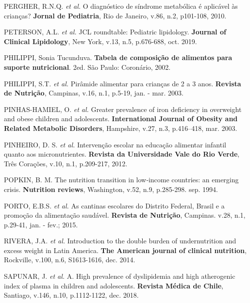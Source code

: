 \bigbreak

\noindent PERGHER, R.N.Q. \textit{et al.} O diagnóstico de síndrome metabólica é aplicável às crianças? \textbf{Jornal de Pediatria}, Rio de Janeiro, v.86, n.2, p101-108, 2010.

\bigbreak

\noindent PETERSON, A.L. \textit{et al.} JCL roundtable: Pediatric lipidology. \textbf{Journal of Clinical Lipidology}, New York, v.13, n.5, p.676-688, oct. 2019.
 
\bigbreak

\noindent PHILIPPI, Sonia Tucunduva. \textbf{Tabela de composição de alimentos para suporte nutricional}. 2ed. São Paulo: Coronário, 2002.

\bigbreak

\noindent PHILIPPI, S.T. \textit{et al.} Pirâmide alimentar para crianças de 2 a 3 anos. \textbf{Revista de Nutrição}, Campinas, v.16, n.1, p.5-19, jan. - mar. 2003.

\bigbreak

\noindent PINHAS-HAMIEL, O. \textit{et al.} Greater prevalence of iron deficiency in overweight and obese children and adolescents. \textbf{International Journal of Obesity and Related Metabolic Disorders}, Hampshire, v.27, n.3, p.416–418, mar. 2003.

\bigbreak

\noindent PINHEIRO, D. S. \textit{et al.} Intervenção escolar na educação alimentar infantil quanto aos micronutrientes. \textbf{Revista da Universidade Vale do Rio Verde}, Três Corações, v.10, n.1, p.209-217, 2012.

\bigbreak

\noindent POPKIN, B. M. The nutrition transition in low‐income countries: an emerging crisis. \textbf{Nutrition reviews}, Washington, v.52, n.9, p.285-298. sep. 1994. 

\bigbreak

\noindent PORTO, E.B.S. \textit{et al.} As cantinas escolares do Distrito Federal, Brasil e a promoção da alimentação saudável. \textbf{Revista de Nutrição}, Campinas. v.28, n.1, p.29-41, jan. - fev.; 2015.

\bigbreak

\noindent RIVERA, J.A. \textit{et al.} Introduction to the double burden of undernutrition and excess weight in Latin America. \textbf{The American journal of clinical nutrition}, Rockville, v.100, n.6, S1613-1616, dec. 2014.

\bigbreak

\noindent SAPUNAR, J. \textit{et al.} A. High prevalence of dyslipidemia and high atherogenic index of plasma in children and adolescents. \textbf{Revista Médica de Chile}, Santiago, v.146, n.10, p.1112-1122, dec. 2018.

